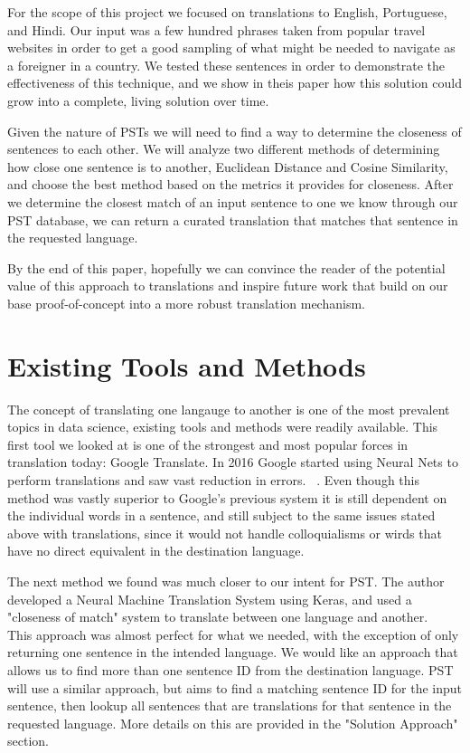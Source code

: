\documentclass[runningheads]{llncs}
\begin{document}
	For the scope of this project we focused on translations to English, Portuguese, and Hindi. Our input was a few hundred phrases taken from popular travel websites in order to get a good sampling of what might be needed to navigate as a foreigner in a country. We tested these sentences in order to demonstrate the effectiveness of this technique, and we show in theis paper how this solution could grow into a complete, living solution over time. 

	Given the nature of PSTs we will need to find a way to determine the closeness of sentences to each other. We will analyze two different methods of determining how close one sentence is to another, Euclidean Distance and Cosine Similarity, and choose the best method based on the metrics it provides for closeness. After we determine the closest match of an input sentence to one we know through our PST database, we can return a curated translation that matches that sentence in the requested language.

	By the end of this paper, hopefully we can convince the reader of the potential value of this approach to translations and inspire future work that build on our base proof-of-concept into a more robust translation mechanism. 
	
	\section{Existing Tools and Methods}
	The concept of translating one langauge to another is one of the most prevalent topics in data science, existing tools and methods were readily available. This first tool we looked at is one of the strongest and most popular forces in translation today: Google Translate. In 2016 Google started using Neural Nets to perform translations and saw vast reduction in errors. ~\cite{ref_url18}. Even though this method was vastly superior to Google's previous system it is still dependent on the individual words in a sentence, and still subject to the same issues stated above with translations, since it would not handle colloquialisms or wirds that have no direct equivalent in the destination language. 

	The next method we found was much closer to our intent for PST. The author developed a Neural Machine Translation System using Keras, and used a "closeness of match" system to translate between one language and another.~\cite{ref_url16} This approach was almost perfect for what we needed, with the exception of only returning one sentence in the intended language. We would like an approach that allows us to find more than one sentence ID from the destination language. PST will use a similar approach, but aims to find a matching sentence ID for the input sentence, then lookup all sentences that are translations for that sentence in the requested language. More details on this are provided in the "Solution Approach" section.
	
\end{document}
